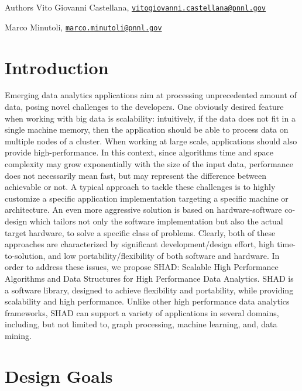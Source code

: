 \begin{DoxyAuthor}{Authors}
Vito Giovanni Castellana, \href{mailto:vitogiovanni.castellana@pnnl.gov}{\tt vitogiovanni.\-castellana@pnnl.\-gov} 

Marco Minutoli, \href{mailto:marco.minutoli@pnnl.gov}{\tt marco.\-minutoli@pnnl.\-gov} 
\end{DoxyAuthor}
\hypertarget{index_Introduction}{}\section{Introduction}\label{index_Introduction}
Emerging data analytics applications aim at processing unprecedented amount of data, posing novel challenges to the developers. One obviously desired feature when working with big data is scalability\-: intuitively, if the data does not fit in a single machine memory, then the application should be able to process data on multiple nodes of a cluster. When working at large scale, applications should also provide high-\/performance. In this context, since algorithms time and space complexity may grow exponentially with the size of the input data, performance does not necessarily mean fast, but may represent the difference between achievable or not. A typical approach to tackle these challenges is to highly customize a specific application implementation targeting a specific machine or architecture. An even more aggressive solution is based on hardware-\/software co-\/design which tailors not only the software implementation but also the actual target hardware, to solve a specific class of problems. Clearly, both of these approaches are characterized by significant development/design effort, high time-\/to-\/solution, and low portability/flexibility of both software and hardware. In order to address these issues, we propose S\-H\-A\-D\-: Scalable High Performance Algorithms and Data Structures for High Performance Data Analytics. S\-H\-A\-D is a software library, designed to achieve flexibility and portability, while providing scalability and high performance. Unlike other high performance data analytics frameworks, S\-H\-A\-D can support a variety of applications in several domains, including, but not limited to, graph processing, machine learning, and, data mining.\hypertarget{index_Goals}{}\section{Design Goals}\label{index_Goals}
